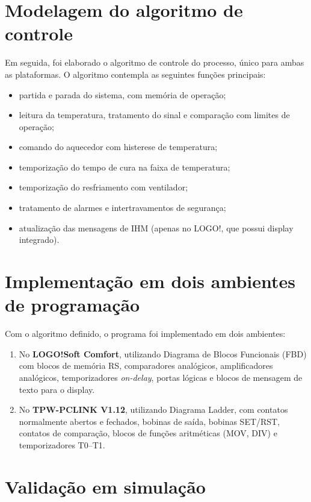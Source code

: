 \documentclass[
  12pt,
  openright,
  oneside,
  a4paper,
  chapter=TITLE,
  section=TITLE,
  brazilian
]{abntex2}
\begin{document}
\section{Modelagem do algoritmo de controle}

Em seguida, foi elaborado o algoritmo de controle do processo, \'{u}nico para ambas as plataformas. O algoritmo contempla as seguintes fun\c{c}\~{o}es principais:

\begin{itemize}
    \item partida e parada do sistema, com mem\'{o}ria de opera\c{c}\~{a}o;
    \item leitura da temperatura, tratamento do sinal e compara\c{c}\~{a}o com limites de opera\c{c}\~{a}o;
    \item comando do aquecedor com histerese de temperatura;
    \item temporiza\c{c}\~{a}o do tempo de cura na faixa de temperatura;
    \item temporiza\c{c}\~{a}o do resfriamento com ventilador;
    \item tratamento de alarmes e intertravamentos de seguran\c{c}a;
    \item atualiza\c{c}\~{a}o das mensagens de IHM (apenas no LOGO!, que possui display integrado).
\end{itemize}

\section{Implementa\c{c}\~{a}o em dois ambientes de programa\c{c}\~{a}o}

Com o algoritmo definido, o programa foi implementado em dois ambientes:
\begin{enumerate}
    \item No \textbf{LOGO!Soft Comfort}, utilizando Diagrama de Blocos Funcionais (FBD) com blocos de mem\'{o}ria RS, comparadores anal\'{o}gicos, amplificadores anal\'{o}gicos, temporizadores \textit{on-delay}, portas l\'{o}gicas e blocos de mensagem de texto para o display.
    \item No \textbf{TPW-PCLINK V1.12}, utilizando Diagrama Ladder, com contatos normalmente abertos e fechados, bobinas de sa\'{i}da, bobinas SET/RST, contatos de compara\c{c}\~{a}o, blocos de fun\c{c}\~{o}es aritm\'{e}ticas (MOV, DIV) e temporizadores T0--T1.
\end{enumerate}

\section{Valida\c{c}\~{a}o em simula\c{c}\~{a}o}
\end{document}
